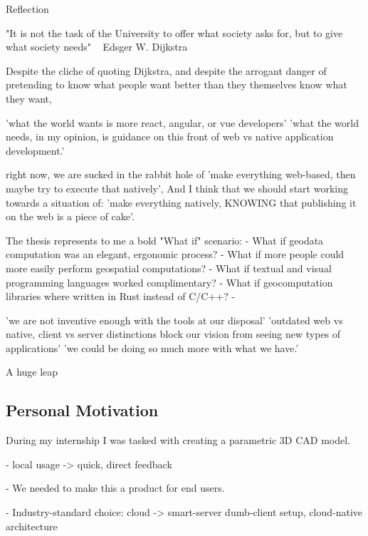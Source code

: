 \begin{note}
  
  Reflection
  
  "It is not the task of the University to offer what society asks for, but to give what society needs" ~ Edsger W. Dijkstra
  
  Despite the cliche of quoting Dijkstra, and despite the arrogant danger of pretending to know what people want better than they themselves know what they want, 
  
  
  'what the world wants is more react, angular, or vue developers'
  'what the world needs, in my opinion, is guidance on this front of web vs native application development.'
  
  right now, we are sucked in the rabbit hole of 'make everything web-based, then maybe try to execute that natively',
  And I think that we should start working towards a situation of: 'make everything natively, KNOWING that publishing it on the web is a piece of cake'.
  
  
  
  The thesis represents to me a bold "What if" scenario: 
  - What if geodata computation was an elegant, ergonomic process?
  - What if more people could more easily perform geospatial computations?
  - What if textual and visual programming languages worked complimentary?    
  - What if geocomputation libraries where written in Rust instead of C/C++?
  - 
  
  'we are not inventive enough with the tools at our disposal'
  'outdated web vs native, client vs server distinctions block our vision from seeing new types of applications'
  'we could be doing so much more with what we have.'
  
  
  A huge leap 
  
  
  \end{note}
  


  \subsection{Personal Motivation}
  During my internship I was tasked with creating a parametric 3D CAD model. 
  
  - local usage 
    -> quick, direct feedback
  
  - We needed to make this a product for end users. 
  
  - Industry-standard choice: cloud 
    -> smart-server dumb-client setup, cloud-native architecture 
  
